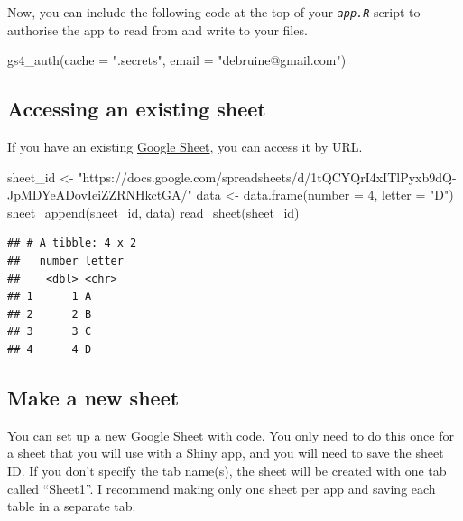 \documentclass[
  oneside]{book}
\newenvironment{Shaded}{\begin{snugshade}}{\end{snugshade}}
\newcommand{\AttributeTok}[1]{\textcolor[rgb]{0.77,0.63,0.00}{#1}}
\newcommand{\DecValTok}[1]{\textcolor[rgb]{0.00,0.00,0.81}{#1}}
\newcommand{\FunctionTok}[1]{\textcolor[rgb]{0.00,0.00,0.00}{#1}}
\newcommand{\NormalTok}[1]{#1}
\newcommand{\OtherTok}[1]{\textcolor[rgb]{0.56,0.35,0.01}{#1}}
\newcommand{\StringTok}[1]{\textcolor[rgb]{0.31,0.60,0.02}{#1}}
\begin{document}
Now, you can include the following code at the top of your \textit{\texttt{app.R}} script to authorise the app to read from and write to your files.

\begin{Shaded}
\begin{Highlighting}[]
\FunctionTok{gs4\_auth}\NormalTok{(}\AttributeTok{cache =} \StringTok{".secrets"}\NormalTok{, }\AttributeTok{email =} \StringTok{"debruine@gmail.com"}\NormalTok{)}
\end{Highlighting}
\end{Shaded}

\hypertarget{accessing-an-existing-sheet}{%
\subsection{Accessing an existing sheet}\label{accessing-an-existing-sheet}}

If you have an existing \href{https://docs.google.com/spreadsheets/u/0/}{Google Sheet}, you can access it by URL.

\begin{Shaded}
\begin{Highlighting}[]
\NormalTok{sheet\_id }\OtherTok{\textless{}{-}} \StringTok{"https://docs.google.com/spreadsheets/d/1tQCYQrI4xITlPyxb9dQ{-}JpMDYeADovIeiZZRNHkctGA/"}
\NormalTok{data }\OtherTok{\textless{}{-}} \FunctionTok{data.frame}\NormalTok{(}\AttributeTok{number =} \DecValTok{4}\NormalTok{, }\AttributeTok{letter =} \StringTok{"D"}\NormalTok{)}
\FunctionTok{sheet\_append}\NormalTok{(sheet\_id, data)}
\FunctionTok{read\_sheet}\NormalTok{(sheet\_id)}
\end{Highlighting}
\end{Shaded}

\begin{verbatim}
## # A tibble: 4 x 2
##   number letter
##    <dbl> <chr> 
## 1      1 A     
## 2      2 B     
## 3      3 C     
## 4      4 D
\end{verbatim}

\hypertarget{make-a-new-sheet}{%
\subsection{Make a new sheet}\label{make-a-new-sheet}}

You can set up a new Google Sheet with code. You only need to do this once for a sheet that you will use with a Shiny app, and you will need to save the sheet ID. If you don't specify the tab name(s), the sheet will be created with one tab called ``Sheet1''. I recommend making only one sheet per app and saving each table in a separate tab.
\end{document}
